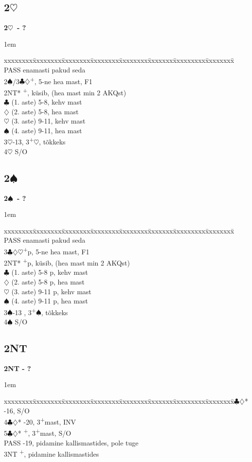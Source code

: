 \documentclass[10pt]{article}
\renewcommand{\c}{$\clubsuit$}
\renewcommand{\d}{$\diamondsuit$}
\newcommand{\h}{$\heartsuit$}
\newcommand{\s}{$\spadesuit$}
\newcommand{\p}{\textsuperscript{+}}
\newenvironment{bidtable}[1][]
{\textbf{#1}
  \begin{adjustwidth}{1em}{}
    \addvspace{2pt}
    \begin{tabbing}
      xxxxxxxx\=xxxxxxxx\=xxxxxxxx\=xxxxxxxx\=xxxxxxxx\=xxxxxxx\=xxxxxxxxx\=xxxxxxxx\=\kill}
{\end{tabbing}\end{adjustwidth}\bigskip}%
\newcommand{\pdfh}{\texorpdfstring{\h{}}{H}}
\newcommand{\pdfs}{\texorpdfstring{\s{}}{S}}
\begin{document}
\subsection{2\pdfh}

\begin{bidtable}[2\h\ - ?]
PASS      \> enamasti pakud seda                  \\
2\s/3\c\d {}\p , 5-ne hea mast, F1             \\
2NT*      \p , küsib, (hea mast min 2 AKQst) \\
          \c \> (1. aste) 5-8, kehv mast      \\
          \d \> (2. aste) 5-8, hea mast       \\
          \h \> (3. aste) 9-11, kehv mast     \\
          \s \> (4. aste) 9-11, hea mast      \\
3\h       {}-13, 3\p\h, tõkkeks                 \\
4\h       \> S/O
\end{bidtable}

\subsection{2\pdfs}

\begin{bidtable}[2\s\ - ?]
PASS    \> enamasti pakud seda                   \\
3\c\d\h {}\p p, 5-ne hea mast, F1             \\
2NT*    \p p, küsib, (hea mast min 2 AKQst) \\
        \c \> (1. aste) 5-8 p, kehv mast     \\
        \d \> (2. aste) 5-8 p, hea mast      \\
        \h \> (3. aste) 9-11 p, kehv mast    \\
        \s \> (4. aste) 9-11 p, hea mast     \\
3\s     {}-13 , 3\p\s, tõkkeks                 \\
4\s     \> S/O
\end{bidtable}

\subsection{2NT}

\begin{bidtable}[2NT - ?]
3\c\d* {}-16, S/O                                 \\
4\c\d* {}-20, 3\p mast, INV                      \\
5\c\d* {}\p, 3\p mast, S/O                       \\
PASS   -19, pidamine kallismastides, pole tuge \\
3NT    \p, pidamine kallismastides
\end{bidtable}
\end{document}
